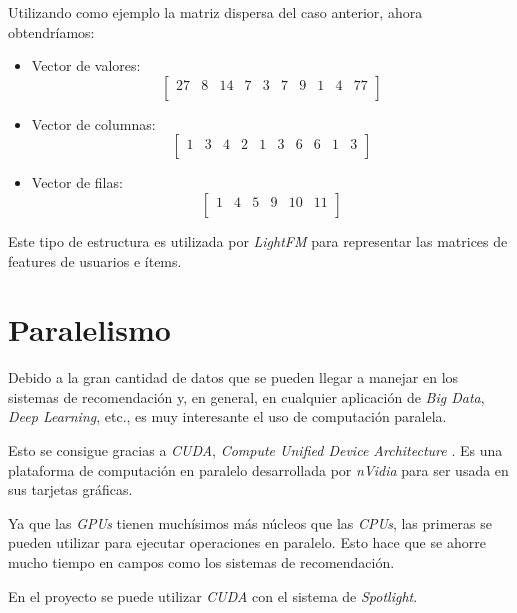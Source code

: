 Utilizando como ejemplo la matriz dispersa del caso anterior, ahora obtendríamos:
\begin{itemize}
\tightlist
\item Vector de valores: \[\begin{bmatrix} 27&8&14&7&3&7&9&1&4&77\\\end{bmatrix}\]
\item Vector de columnas: \[\begin{bmatrix} 1&3&4&2&1&3&6&6&1&3\\
\end{bmatrix}\]
\item Vector de filas: \[\begin{bmatrix} 1&4&5&9&10&11\\\end{bmatrix}\]
\end{itemize}

Este tipo de estructura es utilizada por \textit{LightFM} para representar las matrices de features de usuarios e ítems.

\section{Paralelismo}\label{paralelismo}
Debido a la gran cantidad de datos que se pueden llegar a manejar en los sistemas de recomendación y, en general, en cualquier aplicación de \textit{Big Data}, \textit{Deep Learning}, etc., es muy interesante el uso de computación paralela.

Esto se consigue gracias a \textit{CUDA}, \textit{Compute Unified Device Architecture} \cite{cuda}. Es una plataforma de computación en paralelo desarrollada por \textit{nVidia} para ser usada en sus tarjetas gráficas.

Ya que las \textit{GPUs} tienen muchísimos más núcleos que las \textit{CPUs}, las primeras se pueden utilizar para ejecutar operaciones en paralelo. Esto hace que se ahorre mucho tiempo en campos como los sistemas de recomendación.


En el proyecto se puede utilizar \textit{CUDA} con el sistema de \textit{Spotlight}.